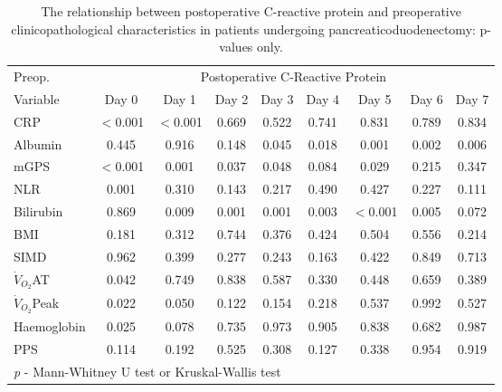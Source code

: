 \begin{sidewaystable}[p]
	\caption{The relationship  between postoperative C-reactive protein and preoperative clinicopathological characteristics in patients undergoing pancreaticoduodenectomy: p-values only. }
	\label{table:sirs_crp_pvalues}
	\centering
	\renewcommand{\arraystretch}{1.2} %

	\begin{tabular}{|l | c c c c c c c c|}
		\hline
		Preop.              &         \multicolumn{8}{c|}{Postoperative C-Reactive Protein}          \\
		Variable            & Day 0    & Day 1    & Day 2 & Day 3 & Day 4 & Day 5    & Day 6 & Day 7 \\ \hline
		CRP                 & $<$0.001 & $<$0.001 & 0.669 & 0.522 & 0.741 & 0.831    & 0.789 & 0.834 \\
		Albumin             & 0.445    & 0.916    & 0.148 & 0.045 & 0.018 & 0.001    & 0.002 & 0.006 \\
		mGPS                & $<$0.001 & 0.001    & 0.037 & 0.048 & 0.084 & 0.029    & 0.215 & 0.347 \\
		NLR                 & 0.001    & 0.310    & 0.143 & 0.217 & 0.490 & 0.427    & 0.227 & 0.111 \\
		Bilirubin           & 0.869    & 0.009    & 0.001 & 0.001 & 0.003 & $<$0.001 & 0.005 & 0.072 \\
		BMI                 & 0.181    & 0.312    & 0.744 & 0.376 & 0.424 & 0.504    & 0.556 & 0.214 \\
		SIMD                & 0.962    & 0.399    & 0.277 & 0.243 & 0.163 & 0.422    & 0.849 & 0.713 \\
		$\dot{V}_{O_2}$AT   & 0.042    & 0.749    & 0.838 & 0.587 & 0.330 & 0.448    & 0.659 & 0.389 \\
		$\dot{V}_{O_2}$Peak & 0.022    & 0.050    & 0.122 & 0.154 & 0.218 & 0.537    & 0.992 & 0.527 \\
		Haemoglobin         & 0.025    & 0.078    & 0.735 & 0.973 & 0.905 & 0.838    & 0.682 & 0.987 \\
		PPS                 & 0.114    & 0.192    & 0.525 & 0.308 & 0.127 & 0.338    & 0.954 & 0.919 \\ \hline
		\multicolumn{9}{l}{\textit{p} - Mann-Whitney U test or Kruskal-Wallis test}
	\end{tabular}	
\end{sidewaystable}
